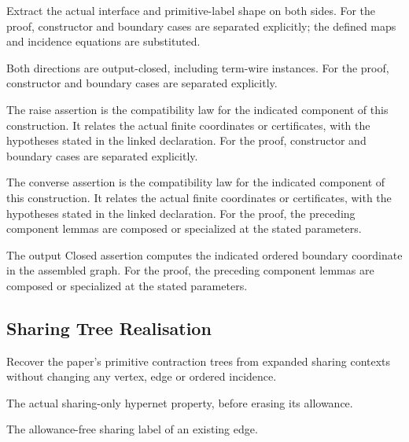 Extract the actual interface and primitive-label shape on both sides.
For the proof, constructor and boundary cases are separated explicitly; the defined maps and incidence equations are substituted.
\par{}

Both directions are output-closed, including term-wire instances.
For the proof, constructor and boundary cases are separated explicitly.
\par{}

The raise assertion is the compatibility law for the indicated component of this construction. It relates the actual finite coordinates or certificates, with the hypotheses stated in the linked declaration.
For the proof, constructor and boundary cases are separated explicitly.
\par{}

The converse assertion is the compatibility law for the indicated component of this construction. It relates the actual finite coordinates or certificates, with the hypotheses stated in the linked declaration.
For the proof, the preceding component lemmas are composed or specialized at the stated parameters.
\par{}

The output Closed assertion computes the indicated ordered boundary coordinate in the assembled graph.
For the proof, the preceding component lemmas are composed or specialized at the stated parameters.
\par{}

\subsection{Sharing Tree Realisation}
Recover the paper's primitive contraction trees from expanded sharing contexts without changing any vertex, edge or ordered incidence.

The actual sharing-only hypernet property, before erasing its allowance.
\par{}

The allowance-free sharing label of an existing edge.
\par{}

